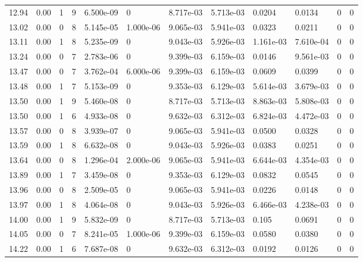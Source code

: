 \documentclass[preview]{standalone}
\begin{document}
{{{{{\begin{tabular}{L{1.2cm}C{1.2cm} C{0.3cm}C{0.5cm} C{1.4cm}C{1.4cm} C{1.4cm}C{1.4cm} C{1.6cm}C{1.6cm} C{1.6cm}C{1.6cm}}
  12.94  &  0.00  & 1     &  9 &  6.500e-09  & 0  &  8.717e-03&   5.713e-03& 0.0204 & 0.0134   &  0 & 0  \\ 
  13.02  &  0.00  & 0     &  8 &  5.145e-05  & 1.000e-06  &  9.065e-03&   5.941e-03& 0.0323 & 0.0211   &  0 & 0  \\ 
  13.11  &  0.00  & 1     &  8 &  5.235e-09  & 0  &  9.043e-03&   5.926e-03& 1.161e-03 & 7.610e-04   &  0 & 0  \\ 
  13.24  &  0.00  & 0     &  7 &  2.783e-06  & 0  &  9.399e-03&   6.159e-03& 0.0146 & 9.561e-03   &  0 & 0  \\ 
  13.47  &  0.00  & 0     &  7 &  3.762e-04  & 6.000e-06  &  9.399e-03&   6.159e-03& 0.0609 & 0.0399   &  0 & 0  \\ 
  13.48  &  0.00  & 1     &  7 &  5.153e-09  & 0  &  9.353e-03&   6.129e-03& 5.614e-03 & 3.679e-03   &  0 & 0  \\ 
  13.50  &  0.00  & 1     &  9 &  5.460e-08  & 0  &  8.717e-03&   5.713e-03& 8.863e-03 & 5.808e-03   &  0 & 0  \\ 
  13.50  &  0.00  & 1     &  6 &  4.933e-08  & 0  &  9.632e-03&   6.312e-03& 6.824e-03 & 4.472e-03   &  0 & 0  \\ 
  13.57  &  0.00  & 0     &  8 &  3.939e-07  & 0  &  9.065e-03&   5.941e-03& 0.0500 & 0.0328   &  0 & 0  \\ 
  13.59  &  0.00  & 1     &  8 &  6.632e-08  & 0  &  9.043e-03&   5.926e-03& 0.0383 & 0.0251   &  0 & 0  \\ 
  13.64  &  0.00  & 0     &  8 &  1.296e-04  & 2.000e-06  &  9.065e-03&   5.941e-03& 6.644e-03 & 4.354e-03   &  0 & 0  \\ 
  13.89  &  0.00  & 1     &  7 &  3.459e-08  & 0  &  9.353e-03&   6.129e-03& 0.0832 & 0.0545   &  0 & 0  \\ 
  13.96  &  0.00  & 0     &  8 &  2.509e-05  & 0  &  9.065e-03&   5.941e-03& 0.0226 & 0.0148   &  0 & 0  \\ 
  13.97  &  0.00  & 1     &  8 &  4.064e-08  & 0  &  9.043e-03&   5.926e-03& 6.466e-03 & 4.238e-03   &  0 & 0  \\ 
  14.00  &  0.00  & 1     &  9 &  5.832e-09  & 0  &  8.717e-03&   5.713e-03& 0.105 & 0.0691   &  0 & 0  \\ 
  14.05  &  0.00  & 0     &  7 &  8.241e-05  & 1.000e-06  &  9.399e-03&   6.159e-03& 0.0580 & 0.0380   &  0 & 0  \\ 
  14.22  &  0.00  & 1     &  6 &  7.687e-08  & 0  &  9.632e-03&   6.312e-03& 0.0192 & 0.0126   &  0 & 0  \\ 

\end{tabular}}}}}}
\end{document}
